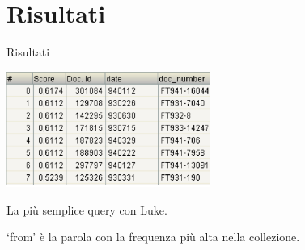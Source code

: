 \section{Risultati}
\begin{frame}{Risultati}
    \begin{center}
        \includegraphics[width=0.5\textwidth]{img/luke-2.png}

        \bigskip
        La più semplice query con Luke.

        `from' è la parola con la frequenza più alta nella collezione.
    \end{center}
\end{frame}
